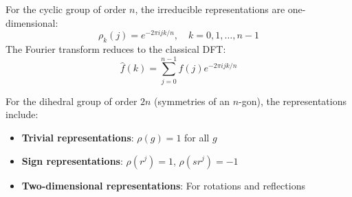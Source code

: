 \begin{example}\label{ex:grupo_ciclico_fourier}
For the cyclic group of order $n$, the irreducible representations are one-dimensional:
\begin{equation}
\rho_k(j) = e^{-2\pi i jk/n}, \quad k = 0, 1, \ldots, n-1
\end{equation}
The Fourier transform reduces to the classical DFT:
\begin{equation}
\hat{f}(k) = \sum_{j=0}^{n-1} f(j) e^{-2\pi i jk/n}
\end{equation}
\end{example}

\begin{example}\label{ex:grupo_diedrico_fourier}
For the dihedral group of order $2n$ (symmetries of an $n$-gon), the representations include:
\begin{itemize}
    \item \textbf{Trivial representations}: $\rho(g) = 1$ for all $g$
    \item \textbf{Sign representations}: $\rho(r^j) = 1$, $\rho(sr^j) = -1$
    \item \textbf{Two-dimensional representations}: For rotations and reflections
\end{itemize}
\end{example}

